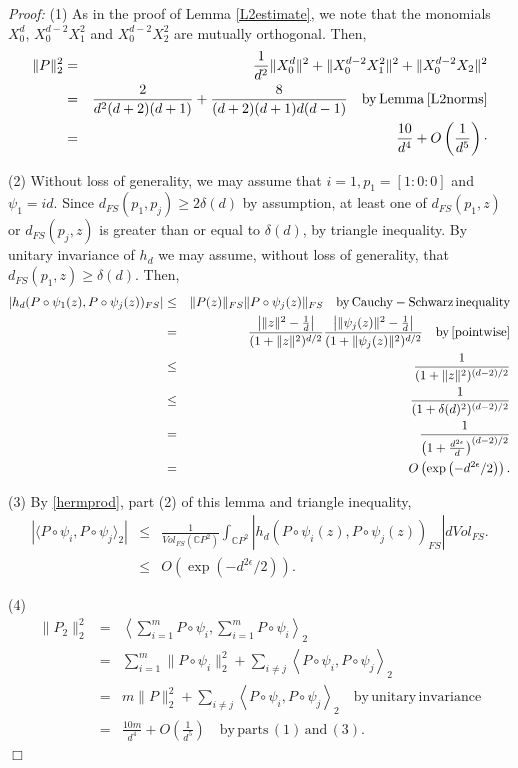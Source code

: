 \documentclass [11pt]{amsart}
\theoremstyle{remark}
\numberwithin{equation}{section}
\numberwithin{theorem}{section}
\begin{document}
\noindent \textit{Proof:} (1) As in the proof of Lemma \ref{L2estimate}, we note that the monomials $X_{0}^d$, $X_{0}^{d-2}X_{1}^2$ and $X_{0}^{d-2}X_{2}^2$ are mutually orthogonal. Then, 
\begin{eqnarray*} 
\|P\|_{2}^2&=& \frac{1}{d^2}\|X_{0}^d\|^2+ \|X_{0}^{d-2}X_{1}^2\|^2+\|X_{0}^{d-2}X_{2}\|^2\\
&=& \frac{2}{d^2(d+2)(d+1)}+\frac{8}{(d+2)(d+1)d(d-1)} \quad \mathrm{by}\, \mathrm{Lemma} \, \ref{L2norms} \\
&=&\frac{10}{d^4}+O\left(\frac{1}{d^5}\right)\cdot
\end{eqnarray*}

(2) Without loss of generality, we may assume that $i=1, p_{1}=[1:0:0]$ and $\psi_{1}=id$. Since $d_{FS}(p_{1},p_{j})\geq 2\delta(d)$ by assumption, at least one of $d_{FS}(p_{1},z)$ or $d_{FS}(p_{j},z)$ is greater than or equal to $\delta(d)$, by triangle inequality. By unitary invariance of $h_{d}$ we may assume, without loss of generality, that $d_{FS}(p_{1},z)\geq \delta(d)$. Then, 
\begin{eqnarray*} 
|h_{d}(P\circ \psi_{1}(z),P\circ \psi_{j}(z))_{FS}| &\leq& \|P(z)\|_{FS}\|P\circ\psi_{j}(z)\|_{FS} \quad \mathrm{by}\, \mathrm{Cauchy-Schwarz}\,\mathrm{inequality} \\
&=& \frac{ \left| \|z\|^2-\frac{1}{d}\right| }{(1+\|z\|^2)^{d/2}} \frac{ \left| \|\psi_{j}(z)\|^2-\frac{1}{d}\right| }{(1+\|\psi_{j}(z)\|^2)^{d/2}} \quad \mathrm{by} \, \eqref{pointwise} \\
&\leq& \frac{1}{(1+\|z\|^2)^{(d-2)/2}} \\
&\leq& \frac{1}{(1+\delta(d)^2)^{(d-2)/2}} \\
&=& \frac{1}{\left(1+\frac{d^{2\epsilon}}{d}\right)^{(d-2)/2}} \\
&=&O\left(\exp\left(-d^{2\epsilon}/2\right)\right).
\end{eqnarray*}

(3) By \eqref{hermprod}, part (2) of this lemma and triangle inequality, 
\begin{eqnarray*}
|\langle P\circ \psi_{i},P\circ \psi_{j}\rangle_{2}|&\leq&\frac{1}{Vol_{FS}(\mathbb{C}P^{2})}\int_{\mathbb{C}P^{2}} |h_{d}(P\circ\psi_{i}(z),P\circ \psi_{j}(z))_{FS}| dVol_{FS}. \\ 
&\leq& O\left(\exp\left(-d^{2\epsilon}/2\right)\right).
\end{eqnarray*} 

(4) 
\begin{eqnarray*}
\|P_{2}\|_{2}^2 &=& \left\langle \sum_{i=1}^{m} P\circ \psi_{i} , \sum_{i=1}^{m} P\circ \psi_{i} \right\rangle_{2} \\
&=& \sum_{i=1}^{m} \|P\circ\psi_{i}\|_{2}^2 + \sum_{i\neq j} \left\langle P\circ \psi_{i}, P\circ \psi_{j} \right\rangle_{2} \\
&=& m\|P\|_{2}^2 +\sum_{i\neq j} \left\langle P\circ \psi_{i}, P\circ \psi_{j} \right\rangle_{2} \quad \mathrm{by}\, \mathrm{unitary} \, \mathrm{invariance} \\
&=& \frac{10 m}{d^4}+O\left(\frac{1}{d^5}\right) \quad \mathrm{by} \, \mathrm{parts} \, \mathrm{(1)} \, \mathrm{and} \, \mathrm{(3)}.
\end{eqnarray*} 
\hfill $\Box$ 
\end{document}

